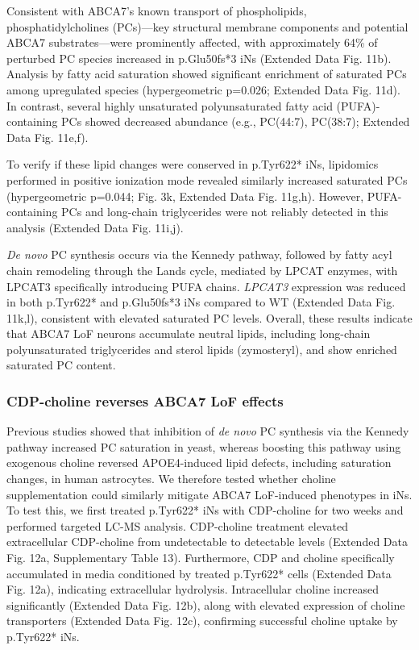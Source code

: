 Consistent with ABCA7's known transport of phospholipids\supercite{Wang2003-wh,Fang2025}, phosphatidylcholines (PCs)—key structural membrane components and potential ABCA7 substrates\supercite{Tomioka2017-nv}—were prominently affected, with approximately 64\% of perturbed PC species increased in p.Glu50fs*3 iNs (Extended Data Fig. 11b). Analysis by fatty acid saturation showed significant enrichment of saturated PCs among upregulated species (hypergeometric p=0.026; Extended Data Fig. 11d). In contrast, several highly unsaturated polyunsaturated fatty acid (PUFA)-containing PCs showed decreased abundance (e.g., PC(44:7), PC(38:7); Extended Data Fig. 11e,f).

To verify if these lipid changes were conserved in p.Tyr622* iNs, lipidomics performed in positive ionization mode revealed similarly increased saturated PCs (hypergeometric p=0.044; Fig. 3k, Extended Data Fig. 11g,h). However, PUFA-containing PCs and long-chain triglycerides were not reliably detected in this analysis (Extended Data Fig. 11i,j).

\textit{De novo} PC synthesis occurs via the Kennedy pathway, followed by fatty acyl chain remodeling through the Lands cycle, mediated by LPCAT enzymes, with LPCAT3 specifically introducing PUFA chains\supercite{Zhao2008-pq}. \textit{LPCAT3} expression was reduced in both p.Tyr622* and p.Glu50fs*3 iNs compared to WT (Extended Data Fig. 11k,l), consistent with elevated saturated PC levels. Overall, these results indicate that ABCA7 LoF neurons accumulate neutral lipids, including long-chain polyunsaturated triglycerides and sterol lipids (zymosteryl), and show enriched saturated PC content.

\subsubsection{CDP-choline reverses ABCA7 LoF effects}
Previous studies showed that inhibition of \textit{de novo} PC synthesis via the Kennedy pathway increased PC saturation in yeast, whereas boosting this pathway using exogenous choline reversed APOE4-induced lipid defects, including saturation changes, in human astrocytes\supercite{Boumann2006-nz,Sienski2021-zt}. We therefore tested whether choline supplementation could similarly mitigate ABCA7 LoF-induced phenotypes in iNs. To test this, we first treated p.Tyr622* iNs with CDP-choline for two weeks and performed targeted LC-MS analysis. CDP-choline treatment elevated extracellular CDP-choline from undetectable to detectable levels (Extended Data Fig. 12a, Supplementary Table 13). Furthermore, CDP and choline specifically accumulated in media conditioned by treated p.Tyr622* cells (Extended Data Fig. 12a), indicating extracellular hydrolysis. Intracellular choline increased significantly (Extended Data Fig. 12b), along with elevated expression of choline transporters (Extended Data Fig. 12c), confirming successful choline uptake by p.Tyr622* iNs.

